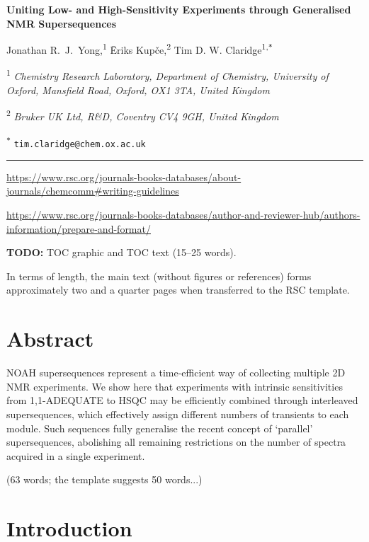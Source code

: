 \documentclass[a4paper,12pt]{article}
\newcommand{\articletitle}{\todo{Uniting Low- and High-Sensitivity Experiments through Generalised NMR Supersequences}}
\newcommand{\crl}{Chemistry Research Laboratory, Department of Chemistry, University of Oxford, Mansfield Road, Oxford, OX1 3TA, United Kingdom}
\newcommand{\brukeruk}{Bruker UK Ltd, R\&D, Coventry CV4 9GH, United Kingdom}
\newcommand{\todo}[1]{{\color{OrangeRed}#1}}
\begin{document}
\begin{refsection}

\begin{center}   %
    \textbf{\Large \articletitle{}}

    \vspace{0.2cm}

    Jonathan R.\ J.\ Yong,\textsuperscript{1} {\=E}riks Kup{\v{c}}e,\textsuperscript{2} Tim D. W. Claridge\textsuperscript{1,\texttt{*}}

    \vspace{0.2cm}

    \textsuperscript{1} \textit{\crl{}}

    \textsuperscript{2} \textit{\brukeruk{}}

    \textsuperscript{\texttt{*}} \texttt{tim.claridge@chem.ox.ac.uk}

    \vspace{0.5cm} \hrule

\end{center}

\small{
    \url{https://www.rsc.org/journals-books-databases/about-journals/chemcomm#writing-guidelines}

    \url{https://www.rsc.org/journals-books-databases/author-and-reviewer-hub/authors-information/prepare-and-format/}
}

\todo{\textbf{TODO:} TOC graphic and TOC text (15--25 words).}

\todo{In terms of length, the main text (without figures or references) forms approximately two and a quarter pages when transferred to the RSC template.}

\section*{Abstract}

NOAH supersequences represent a time-efficient way of collecting multiple 2D NMR experiments. 
We show here that experiments with intrinsic sensitivities from 1,1-ADEQUATE to HSQC may be efficiently combined through interleaved supersequences, which effectively assign different numbers of transients to each module.
Such sequences fully generalise the recent concept of `parallel' supersequences, abolishing all remaining restrictions on the number of spectra acquired in a single experiment.

\todo{(63 words; the template suggests 50 words...)}

\section{Introduction}


\end{refsection}
\end{document}
